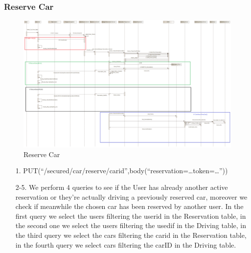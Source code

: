 \documentclass[12pt]{article}
\begin{document}
\subsubsection{Reserve Car}
\begin{figure}[h]
	\centering
	\includegraphics[width=\textwidth]{../Images/Sequence_Final/Reserve_Car}
	\caption{Reserve Car}
\end{figure}
\begin{enumerate}
	\item[1.] PUT(``/secured/car/reserve/{carid}'',body(``reservation=…token=…''))
	\item[2-5.] We perform 4 queries to see if the User has already another active reservation or they're actually driving a previously reserved car, moreover we check if meanwhile the chosen car has been reserved by another user. In the first query we select the users filtering the userid in the Reservation table, in the second one we select the users filtering the usedif in the Driving table, in the third query we select the cars filtering the carid in the Reservation table, in the fourth query we select cars filtering the carID in the Driving table.
\end{enumerate}
\clearpage
\end{document}
